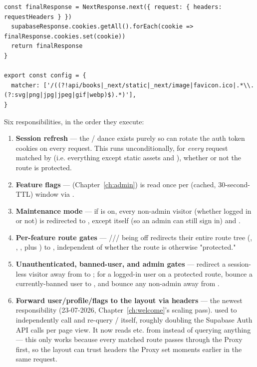 \begin{lstlisting}[caption={\pathname{src/proxy.ts} — full file}]
  const finalResponse = NextResponse.next({ request: { headers: requestHeaders } })
  supabaseResponse.cookies.getAll().forEach(cookie => finalResponse.cookies.set(cookie))
  return finalResponse
}

export const config = {
  matcher: ['/((?!api/books|_next/static|_next/image|favicon.ico|.*\\.(?:svg|png|jpg|jpeg|gif|webp)$).*)'],
}
\end{lstlisting}

Six responsibilities, in the order they execute:

\begin{enumerate}
  \item \textbf{Session refresh} — the / dance exists purely so  can rotate the auth token cookies on every request. This runs unconditionally, for \emph{every} request matched by  (i.e. everything except static assets and ), whether or not the route is protected.
  \item \textbf{Feature flags} —  (Chapter~\ref{ch:admin}) is read once per (cached, 30-second-TTL) window via .
  \item \textbf{Maintenance mode} — if  is on, every non-admin visitor (whether logged in or not) is redirected to , except  itself (so an admin can still sign in) and .
  \item \textbf{Per-feature route gates} — /// being off redirects their entire route tree (, , ,  plus ) to , independent of whether the route is otherwise "protected."
  \item \textbf{Unauthenticated, banned-user, and admin gates} — redirect a session-less visitor away from  to ; for a logged-in user on a protected route, bounce a currently-banned user to , and bounce any non-admin away from .
  \item \textbf{Forward user/profile/flags to the layout via headers} — the newest responsibility (23-07-2026, Chapter~\ref{ch:welcome}'s scaling pass).  used to independently call  and re-query / itself, roughly doubling the Supabase Auth API calls per page view. It now reads  etc. from  instead of querying anything — this only works because every matched route passes through the Proxy first, so the layout can trust headers the Proxy set moments earlier in the same request.
\end{enumerate}

